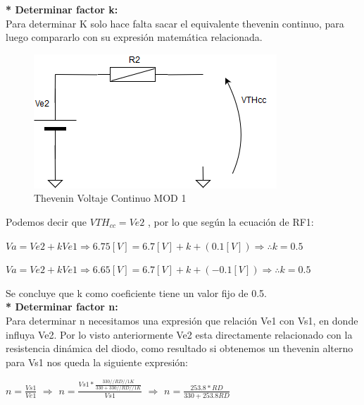 \textbf{* Determinar factor k:}\\[0.2cm]
Para determinar K solo hace falta sacar el equivalente thevenin continuo, para luego compararlo con su expresión matemática relacionada.\par

\begin{figure}[h!]
    \Centering
    \includegraphics[scale=0.45]{Imagenes/6DisenoSistema/TheveninContinuo.png}
    \caption{Thevenin Voltaje Continuo MOD 1}
	\label{fig:figure6}
\end{figure}





Podemos decir que $VTH_{cc} = Ve2$ , por lo que según la ecuación de RF1:\par 
\begin{center}
    $Va = Ve2 + kVe1 \Rightarrow 6.75 [V] = 6.7 [V] + k +(0.1[V]) \Rightarrow \therefore k = 0.5$\par
    $Va = Ve2 + kVe1 \Rightarrow 6.65 [V] = 6.7 [V] + k +(-0.1[V]) \Rightarrow \therefore k = 0.5$\par
\end{center}
Se concluye que k como coeficiente tiene un valor fijo de 0.5.\\[0.2cm] 

\textbf{* Determinar factor n:}\\[0.1cm]

Para determinar n necesitamos una expresión que relación Ve1 con Vs1, en donde influya Ve2. Por lo visto anteriormente Ve2 esta directamente relacionado con la resistencia dinámica del diodo, como resultado si obtenemos un thevenin alterno para Vs1 nos queda la siguiente expresión:\par 
\begin{center}
    $n = \frac{Vs1}{Ve1}$ $\Rightarrow $ $n = \frac{Vs1 *\frac{330 // RD // 1K}{330 + 330// RD // 1K}}{Vs1}$ $\Rightarrow$ $n = \frac{253.8*RD}{330 + 253.8RD}$
\end{center}

